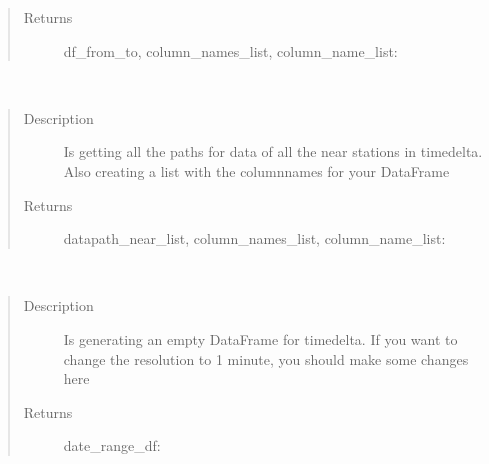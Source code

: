 \documentclass[letterpaper,10pt,english]{sphinxmanual}
\begin{document}
\begin{fulllineitems}
\begin{fulllineitems}
\begin{quote}
\begin{description}
\item[{Returns}] \leavevmode
\sphinxAtStartPar
df\_from\_to, column\_names\_list, column\_name\_list: 

\end{description}\end{quote}

\end{fulllineitems}


\begin{fulllineitems}
\label{\detokenize{DwdNearNeighbor:DwdNearNeighbor.NearNeighbor.datapath_near}}~\begin{quote}\begin{description}
\item[{Description}] \leavevmode
\sphinxAtStartPar
Is getting all the paths for data of all the near stations in timedelta. Also creating a list with the columnnames for your DataFrame

\item[{Returns}] \leavevmode
\sphinxAtStartPar
datapath\_near\_list, column\_names\_list, column\_name\_list: 

\end{description}\end{quote}

\end{fulllineitems}


\begin{fulllineitems}
\label{\detokenize{DwdNearNeighbor:DwdNearNeighbor.NearNeighbor.date_range_df}}~\begin{quote}\begin{description}
\item[{Description}] \leavevmode
\sphinxAtStartPar
Is generating an empty DataFrame for timedelta. If you want to change the resolution to 1 minute, you should make some changes here

\item[{Returns}] \leavevmode
\sphinxAtStartPar
date\_range\_df: 


\end{description}
\end{quote}
\end{fulllineitems}
\end{fulllineitems}
\end{document}
